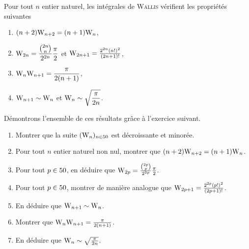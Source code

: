 \begin{theo}{}  Pour tout $n$ entier naturel, les intégrales de \textsc{Wallis} vérifient les propriétés suivantes
\begin{enumerate}[label=(\roman*)]
    \item $(n + 2) \mathrm{W}_{n+2} = (n + 1) \mathrm{W}_n$,  
    \item $\displaystyle \mathrm{W}_{2n} = \frac{\binom{2n}{n}}{2^{2n}}\frac{\pi}{2}$ et $\mathrm{W}_{2n+1} = \frac{2^{2n} (n!)^2}{(2n+1)!}$,
    \item $\displaystyle \mathrm{W}_n \mathrm{W}_{n+1} = \frac{\pi}{2(n+1)}$,
    \item $\mathrm{W}_{n+1} \sim \mathrm{W}_n$ et $\displaystyle \mathrm{W}_n \sim \sqrt{\frac{\pi}{2n}}$.
\end{enumerate}
\end{theo}
Démontrons l'ensemble de ces résultats grâce à l'exercice suivant.
\begin{exercice}\label{exo:propWallis}
\begin{enumerate}
\item Montrer que la suite $(\mathrm{W}_n)_{n\in50}$ est décroissante et minorée.

\item Pour tout $n$ entier naturel non nul, montrer que $(n + 2) \mathrm{W}_{n+2} = (n + 1) \mathrm{W}_n$.

\item Pour tout $p \in 50$, en déduire que $\mathrm{W}_{2p} = \frac{\binom{2p}{p}}{2^{2p}} \frac{\pi}{2}$.

\item Pour tout $p \in 50$, montrer de manière analogue que $\mathrm{W}_{2p+1} = \frac{2^{2p} (p!)^2}{(2p+1)!}$.

\item En déduire que $\mathrm{W}_{n+1} \sim \mathrm{W}_n$.

\item Montrer que $\mathrm{W}_n \mathrm{W}_{n+1} = \frac{\pi}{2 (n + 1)}$.

\item En déduire que $\mathrm{W}_n \sim \sqrt{\frac{\pi}{2n}}$.
\end{enumerate}
\end{exercice}

